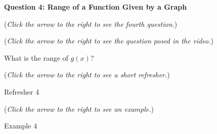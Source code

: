 \documentclass{ximera}
\begin{document}
\textbf{Question 4: Range of a Function Given by a Graph}
\begin{question}
\begin{flushright}
{\color{blue}(\emph{Click the arrow to the right to see the fourth question.})}
\end{flushright}
\begin{center}
\begin{expandable}
\begin{flushright}
{\color{blue}(\emph{Click the arrow to the right to see the question
posed in the video.})}
\end{flushright}
\begin{expandable}
What is the range of $g(x)$?
\begin{multipleChoice}
\choice{$[-1,1)\cup(1,3]\cup[4,6]$}
\choice{$[-1,3]\cup[4,6]$}
\choice[correct]{$\{2\} \cup [6,15)$}
\choice{$\{2\}\cup [9,15)$}
\choice{$\{2\} \cup [6,9)$}
\end{multipleChoice}
\begin{flushright}
{\color{blue}(\emph{Click the arrow to the right to see a short refresher.})}
\end{flushright}
\begin{expandable}
\begin{center}
Refresher 4
\end{center}
\end{expandable}
\begin{flushright}
{\color{blue}(\emph{Click the arrow to the right to see an example.})}
\end{flushright}
\begin{expandable}
\begin{center}
Example 4
\end{center}
\end{expandable}
\end{expandable}
\end{expandable}
\end{center}
\end{question}
\end{document}

